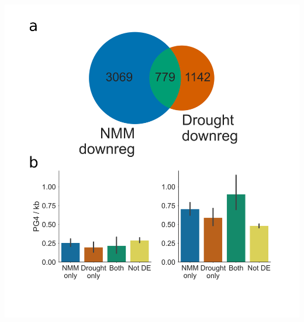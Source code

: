 \documentclass[12pt,a4paper,]{report}
\let\origfigure=\figure
\let\endorigfigure=\endfigure
\renewenvironment{figure}[1][2] {
    \expandafter\origfigure\expandafter[H]
} {
    \endorigfigure
}
\begin{document}
\begin{figure}[htbp]
\centering
\includegraphics[width=\textwidth,height=562pt,keepaspectratio]{chapter_5/figures/nmm_drought_venn.png}
\caption[Overlap of genes downregulated by NMM with those downregulated by Drought stress.]{\textbf{Overlap   of   genes   downregulated   by   NMM   with   those   downregulated   by   Drought   stress.}   \textbf{a)}   Venn   diagram   reporting   the   overlap   of   genes   downregulated   by   NMM   with   those   downregulated   by   drought   stress.   \textbf{c)}   Bar   plot   showing   the   average   PG4   densities   in   5’   UTRs   of   NMM   and   drought   stress   downregulated   genesets.   Left   and   right   panels   show   densities   on   the   coding   and   template   strands,   respectively.   Both   genesets   show   an   greater   exonic   G4   density   on   the   template   strand   than   genes   not   regulated   by   either   drug,   however   genes   which   are   regulated   by   both   drugs   had   the   greatest   average   PG4   density   in   5’   UTRs.   Bar   colours   match   set   colours   from   Fig   3b.   Errorbars   are   68\%   confidence   intervals   for   mean   generated   using   1000   bootstrapped   samples.   \label{nmm_drought}}
\end{figure}
\end{document}
